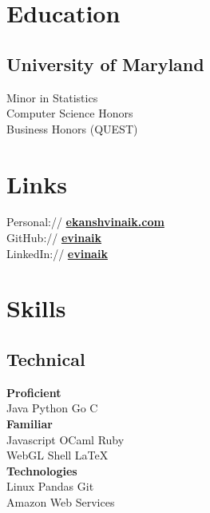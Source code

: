\documentclass[]{deedy-resume}
\begin{document}
\begin{minipage}[t][.7\textheight][t]{0.33\textwidth} 


\section{Education} 

\subsection{University of Maryland}
Minor in Statistics \\
Computer Science Honors \\
Business Honors (QUEST)  \\
\sectionsep %


\section{Links} 
Personal:// \href{http://ekanshvinaik.com}{\bf ekanshvinaik.com} \\
GitHub:// \href{https://github.com/evinaik}{\bf evinaik} \\
LinkedIn://  \href{https://www.linkedin.com/in/evinaik}{\bf evinaik} \\
\sectionsep %



\section{Skills}
\subsection{Technical}
\textbf{Proficient} \\
Java \textbullet{} Python \textbullet{} Go \textbullet{} C \\
\textbf{Familiar} \\
Javascript \textbullet{}  OCaml \textbullet{} Ruby \\
WebGL \textbullet{} Shell \textbullet{} \LaTeX \\ %
\textbf{Technologies} \\
Linux \textbullet{} Pandas \textbullet{} Git \textbullet{} \\ %
Amazon Web Services \\
\sectionsep %


\end{minipage}
\end{document}
